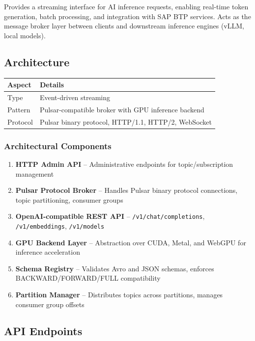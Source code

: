 \documentclass[11pt,a4paper]{article}
\begin{document}
Provides a streaming interface for AI inference requests, enabling real-time token generation, batch processing, and integration with SAP BTP services. Acts as the message broker layer between clients and downstream inference engines (vLLM, local models).

\subsection{Architecture}

\begin{tabular}{@{}L{4cm}L{10cm}@{}}
\toprule
\textbf{Aspect} & \textbf{Details} \\
\midrule
Type & Event-driven streaming \\
Pattern & Pulsar-compatible broker with GPU inference backend \\
Protocol & Pulsar binary protocol, HTTP/1.1, HTTP/2, WebSocket \\
\bottomrule
\end{tabular}

\subsubsection{Architectural Components}

\begin{enumerate}[noitemsep]
    \item \textbf{HTTP Admin API} -- Administrative endpoints for topic/subscription management
    \item \textbf{Pulsar Protocol Broker} -- Handles Pulsar binary protocol connections, topic partitioning, consumer groups
    \item \textbf{OpenAI-compatible REST API} -- \texttt{/v1/chat/completions}, \texttt{/v1/embeddings}, \texttt{/v1/models}
    \item \textbf{GPU Backend Layer} -- Abstraction over CUDA, Metal, and WebGPU for inference acceleration
    \item \textbf{Schema Registry} -- Validates Avro and JSON schemas, enforces BACKWARD/FORWARD/FULL compatibility
    \item \textbf{Partition Manager} -- Distributes topics across partitions, manages consumer group offsets
\end{enumerate}

\subsection{API Endpoints}
\end{document}
